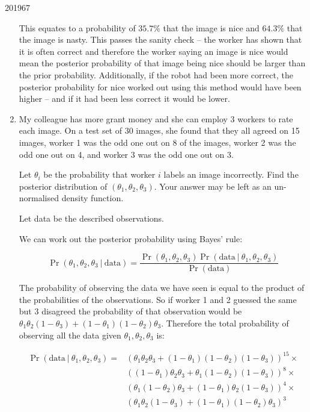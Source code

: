 \documentclass[10pt,\jkfside,a4paper]{article}
\begin{document}
\begin{examquestion}{2019}{6}{7}
\begin{enumerate}[label=(\alph*)]
This equates to a probability of $35.7\%$ that the image is nice and
$64.3\%$ that the image is nasty. This passes the sanity check -- the worker
has shown that it is often correct and therefore the worker saying an image
is nice would mean the posterior probability of that image being nice should
be larger than the prior probability. Additionally, if the robot had been
more correct, the posterior probability for nice worked out using this method
would have been higher -- and if it had been less correct it would be lower.

\item My colleague has more grant money and she can employ 3 workers to rate
each image. On a test set of 30 images, she found that they all agreed on 15
images, worker 1 was the odd one out on 8 of the images, worker 2 was the
odd one out on 4, and worker 3 was the odd one out on 3.

Let $\theta_i$ be the probability that worker $i$ labels an image
incorrectly. Find the posterior distribution of $(\theta_1, \theta_2,
\theta_3)$. Your answer may be left as an un-normalised density function.

Let data be the described observations.

We can work out the posterior probability using Bayes' rule:

\[
\Pr(\theta_1, \theta_2, \theta_3 \ | \ \text{data})
= \frac{\Pr(\theta_1, \theta_2, \theta_3)\Pr(\text{data} \ | \ \theta_1, \theta_2, \theta_3)}{\Pr
(\text{data})}
\]

The probability of observing the data we have seen is equal to the
product of the probabilities of the observations. So if worker 1 and 2
guessed the same but 3 disagreed the probability of that observation would be
$\theta_1\theta_2(1 - \theta_3) + (1 - \theta_1)(1 - \theta_2)\theta_3$.
Therefore the total probability of observing all the data given $\theta_1,
\theta_2, \theta_3$ is:

\[
\begin{split}
\Pr(\text{data} \ | \ \theta_1, \theta_2, \theta_3) =&
(\theta_1\theta_2\theta_3 + (1 - \theta_1)(1 - \theta_2)(1 - \theta_3))
^{15}\times \\
& ((1 - \theta_1)\theta_2\theta_3 + \theta_1(1 - \theta_2)(1 - \theta_3))^8
\times\\
& (\theta_1(1 - \theta_2)\theta_3 + (1 - \theta_1)\theta_2(1 - \theta_3))^4
\times\\
&(\theta_1\theta_2(1 - \theta_3) + (1 - \theta_1)(1 - \theta_2)\theta_3)^3
\end{split}
\]


\end{enumerate}
\end{examquestion}
\end{document}
